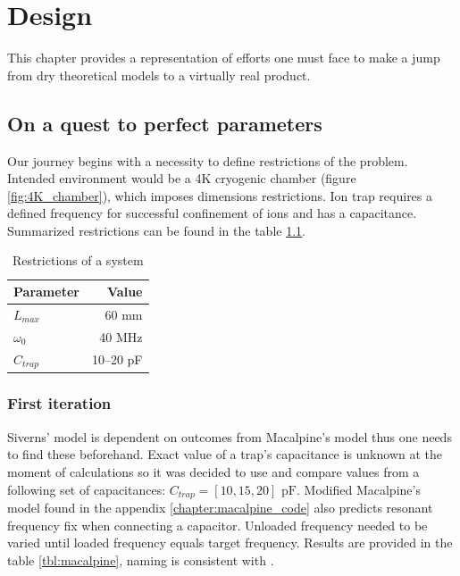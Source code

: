 \chapter{Design}
This chapter provides a representation of efforts one must face to make a jump from dry theoretical models to a virtually real product.

\section{On a quest to perfect parameters}
Our journey begins with a necessity to define restrictions of the problem. Intended environment would be a 4K cryogenic chamber (figure \ref{fig:4K_chamber}), which imposes dimensions restrictions. Ion trap requires a defined frequency for successful confinement of ions and has a capacitance. Summarized restrictions can be found in the table \ref{tbl:restrictions}.

\begin{table}[h]
\centering
\begin{tabular}{| l | r |}
	\hline
	Parameter & Value \\
	\hline \hline
	$L_{max}$ & 60 mm \\
	\hline
	$\omega_0$ & 40 MHz \\
	\hline
	$C_{trap}$ & 10--20 pF \\
	\hline
\end{tabular}	
\caption{Restrictions of a system}
\label{tbl:restrictions}
\end{table}

\subsection{First iteration}
Siverns' model \cite{Siverns2012} is dependent on outcomes from Macalpine's model \cite{Macalpine2000} thus one needs to find these beforehand. Exact value of a trap's capacitance is unknown at the moment of calculations so it was decided to use and compare values from a following set of capacitances: $C_{trap} = [10, 15, 20]\text{ pF}$. Modified Macalpine's model found in the appendix \ref{chapter:macalpine_code} also predicts resonant frequency fix when connecting a capacitor. Unloaded frequency needed to be varied until loaded frequency equals target frequency. Results are provided in the table \ref{tbl:macalpine}, naming is consistent with \cite{Macalpine2000}.

